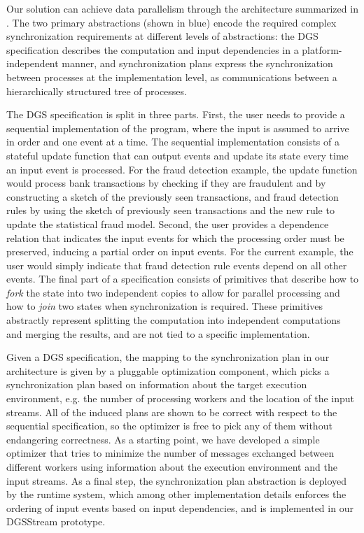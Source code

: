Our solution can achieve data parallelism through the architecture
summarized in .
The two primary abstractions (shown in blue) encode the required complex synchronization requirements at different levels of abstractions:
the DGS specification describes the computation and input dependencies
in a platform-independent manner,
and synchronization plans express the synchronization
between processes at the implementation level,
as communications between a hierarchically structured tree of processes.

The DGS specification is split in three parts.
First, the user
needs to provide a sequential implementation of the program, where the
input is assumed to arrive in order and one event at a time. The
sequential implementation consists of a stateful update function that
can output events and update its state every time an input event is
processed. For the fraud detection example, the update function would
process bank transactions by checking if they are fraudulent and by
constructing a sketch of the previously seen transactions, and fraud
detection rules by using the sketch of previously seen transactions
and the new rule to update the statistical fraud model. Second, the
user provides a dependence relation that indicates the input events
for which the processing order must be preserved, inducing a partial
order on input events. For the current example, the user would simply
indicate that fraud detection rule events depend on all other
events. The final part of a specification consists of primitives that
describe how to \emph{fork} the state into two independent copies to
allow for parallel processing and how to \emph{join} two states when
synchronization is required. These primitives abstractly represent
splitting the computation into independent computations and merging
the results, and are not tied to a specific implementation.

Given a DGS specification,
the mapping to the synchronization plan in our architecture
is given by a pluggable optimization component, which picks
a synchronization plan based on information about the target execution
environment, e.g. the number of processing workers and the location of
the input streams. All of the induced plans are shown to be correct with respect to the sequential specification, so the optimizer is free to pick any of them without endangering correctness. As a starting point, we have developed a simple
optimizer that tries to minimize the number of messages exchanged
between different workers using information about the execution
environment and the input streams.
As a final step, the synchronization plan abstraction
is deployed by the runtime system,
which among other implementation details enforces the ordering of input events based on input dependencies,
and is implemented in our DGSStream prototype.


